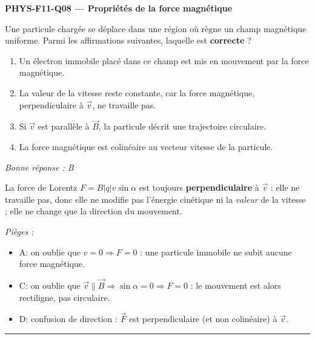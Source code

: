 \documentclass[11pt,a4paper]{article}
\newcommand{\vv}[1]{\vec{#1}}\newcommand{\ds}{\displaystyle}
\begin{document}
\noindent\textbf{PHYS-F11-Q08 --- Propriétés de la force magnétique}\par
Une particule chargée se déplace dans une région où règne un champ magnétique uniforme. Parmi les affirmations suivantes, laquelle est \textbf{correcte} ?
\begin{enumerate}[label=\Alph*)]
\item Un électron immobile placé dans ce champ est mis en mouvement par la force magnétique.
\item La valeur de la vitesse reste constante, car la force magnétique, perpendiculaire à $\vv{v}$, ne travaille pas.
\item Si $\vv{v}$ est parallèle à $\vv{B}$, la particule décrit une trajectoire circulaire.
\item La force magnétique est colinéaire au vecteur vitesse de la particule.
\end{enumerate}
\textit{Bonne réponse : B}\par
La force de Lorentz $F=B|q|v\sin\alpha$ est toujours \textbf{perpendiculaire} à $\vv{v}$ : elle ne travaille pas, donc elle ne modifie pas l'énergie cinétique ni la \emph{valeur} de la vitesse ; elle ne change que la direction du mouvement.\par
\textit{Pièges :}
\begin{itemize}
\item A: on oublie que $v=0\Rightarrow F=0$ : une particule immobile ne subit aucune force magnétique.
\item C: on oublie que $\vv{v}\parallel\vv{B}\Rightarrow\sin\alpha=0\Rightarrow F=0$ : le mouvement est alors rectiligne, pas circulaire.
\item D: confusion de direction : $\vv{F}$ est perpendiculaire (et non colinéaire) à $\vv{v}$.
\end{itemize}
\vspace{8pt}\hrule\vspace{8pt}
\end{document}
